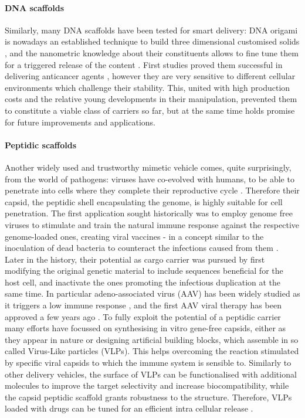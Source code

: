 \paragraph{DNA scaffolds} Similarly, many DNA scaffolds have been tested for smart delivery: DNA origami is nowadays an established technique to build three dimensional customised solids \cite{Linko2015}, and the nanometric knowledge about their constituents allows to fine tune them for a triggered release of the content \cite{Douglas2012}. First studies proved them successful in delivering anticancer agents \cite{Zhang2014, Jiang2012}, however they are very sensitive to different cellular environments which challenge their stability. This, united with high production costs and the relative young developments in their manipulation, prevented them to constitute a viable class of carriers so far, but at the same time holds promise for future improvements and applications.

\paragraph{Peptidic scaffolds} Another widely used and trustworthy mimetic vehicle comes, quite surprisingly, from the world of pathogens: viruses have co-evolved with humans, to be able to penetrate into cells where they complete their reproductive cycle \cite{Lobo2009}. Therefore their capsid, the peptidic shell encapsulating the genome, is highly suitable for cell penetration. The first application sought historically was to employ genome free viruses to stimulate and train the natural immune response against the respective genome-loaded ones, creating viral vaccines - in a concept similar to the inoculation of dead bacteria to counteract the infections caused from them \cite{Lauer2017}.
Later in the history, their potential as cargo carrier was pursued by first modifying the original genetic material to include sequences beneficial for the host cell, and inactivate the ones promoting the infectious duplication at the same time. In particular adeno-associated virus (AAV) has been widely studied \cite{Daya2008} as it triggers a low immune response \cite{Buning2015}, and the first AAV viral therapy has been approved a few years ago \cite{Smalley2017}.
%
To fully exploit the potential of a peptidic carrier many efforts have focussed on synthesising in vitro gene-free capsids, either as they appear in nature \cite{Wu2009} or designing artificial building blocks, which assemble in so called Virus-Like particles (VLPs). This helps overcoming the reaction stimulated by specific viral capsids to which the immune system is sensible to.
%
Similarly to other delivery vehicles, the surface of VLPs can be functionalised with additional molecules to improve the target selectivity and increase biocompatibility, while the capsid peptidic scaffold grants robustness to the structure. Therefore, VLPs loaded with drugs can be tuned for an efficient intra cellular release \cite{Ma2012}.


